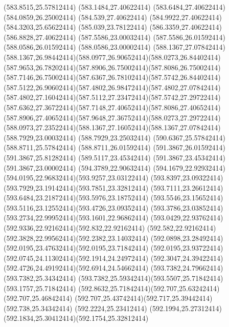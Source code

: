 {{	\lineto(583.8515,25.57812414)
	\lineto(583.1484,27.40622414)
	\lineto(583.6484,27.40622414)
	\lineto(584.0859,26.25002414)
	\lineto(584.539,27.40622414)
	\lineto(584.9922,27.40622414)
	\lineto(584.3203,25.65622414)
	\lineto(585.039,23.78122414)
	\lineto(586.3359,27.40622414)
	\lineto(586.8828,27.40622414)
	\closepath
	\moveto(587.5586,23.00032414)
	\lineto(587.5586,26.01592414)
	\lineto(588.0586,26.01592414)
	\lineto(588.0586,23.00002414)
	\closepath
	\moveto(588.1367,27.07842414)
	\curveto(588.1367,26.98442414)(588.0977,26.90652414)(588.0273,26.84402414)
	\curveto(587.9653,26.78202414)(587.8906,26.75002414)(587.8086,26.75002414)
	\curveto(587.7146,26.75002414)(587.6367,26.78102414)(587.5742,26.84402414)
	\curveto(587.5122,26.90602414)(587.4802,26.98472414)(587.4802,27.07842414)
	\curveto(587.4802,27.16042414)(587.5112,27.23472414)(587.5742,27.29722414)
	\curveto(587.6362,27.36722414)(587.7148,27.40652414)(587.8086,27.40652414)
	\curveto(587.8906,27.40652414)(587.9648,27.36752414)(588.0273,27.29722414)
	\curveto(588.0973,27.23522414)(588.1367,27.16052414)(588.1367,27.07842414)
	\closepath
	\moveto(588.7929,23.00032414)
	\lineto(588.7929,23.25032414)
	\lineto(590.6367,25.57842414)
	\lineto(588.8711,25.57842414)
	\lineto(588.8711,26.01592414)
	\lineto(591.3867,26.01592414)
	\lineto(591.3867,25.81282414)
	\lineto(589.5117,23.45342414)
	\lineto(591.3867,23.45342414)
	\lineto(591.3867,23.00002414)
	\closepath
	\moveto(594.3789,22.90632414)
	\curveto(594.1679,22.92932414)(594.0195,22.96832414)(593.9257,23.03122414)
	\curveto(593.8397,23.09322414)(593.7929,23.19142414)(593.7851,23.32812414)
	\curveto(593.7111,23.26612414)(593.6484,23.21872414)(593.5976,23.18752414)
	\curveto(593.5546,23.15652414)(593.5116,23.12552414)(593.4726,23.09352414)
	\curveto(593.3786,23.03852414)(593.2734,22.99952414)(593.1601,22.96862414)
	\curveto(593.0429,22.93762414)(592.9336,22.92162414)(592.832,22.92162414)
	\curveto(592.582,22.92162414)(592.3828,22.99562414)(592.2382,23.14032414)
	\curveto(592.0898,23.28492414)(592.0195,23.47632414)(592.0195,23.71842414)
	\curveto(592.0195,23.93722414)(592.0745,24.11302414)(592.1914,24.24972414)
	\curveto(592.3047,24.39422414)(592.4726,24.49192414)(592.6914,24.54662414)
	\lineto(593.7382,24.79662414)
	\lineto(593.7382,25.34342414)
	\curveto(593.7382,25.59342414)(593.5507,25.71842414)(593.1757,25.71842414)
	\curveto(592.8632,25.71842414)(592.707,25.63242414)(592.707,25.46842414)
	\curveto(592.707,25.43742414)(592.717,25.39442414)(592.738,25.34342414)
	\lineto(592.2224,25.23412414)
	\curveto(592.1994,25.27312414)(592.1834,25.30412414)(592.1754,25.32812414)
}}
